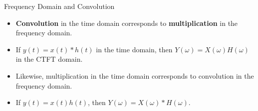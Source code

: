 




\begin{frame}{Frequency Domain and Convolution}
    \begin{itemize}
        \item \textbf{Convolution} in the time domain corresponds to \textbf{multiplication} in the frequency domain.
        \item If $y(t) = x(t) * h(t)$ in the time domain, then $Y(\omega) = X(\omega)H(\omega)$ in the CTFT domain.
        \item Likewise, multiplication in the time domain corresponds to convolution in the frequency domain.
        \item If $y(t) = x(t)h(t)$, then $Y(\omega) = X(\omega) * H(\omega)$.
    \end{itemize}
\end{frame}
